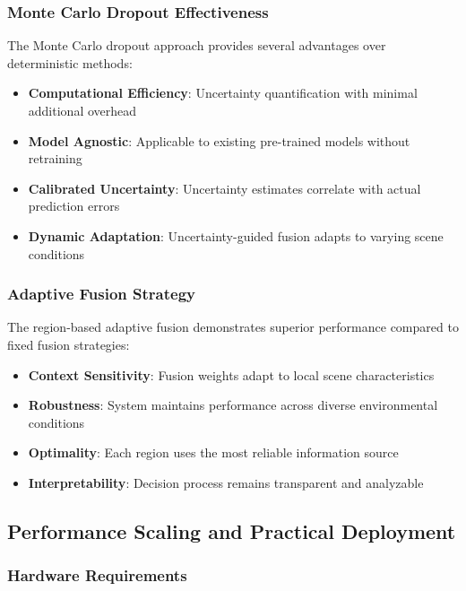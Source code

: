 \documentclass[12pt,oneside]{book}
\begin{document}
\subsubsection{Monte Carlo Dropout Effectiveness}

The Monte Carlo dropout approach provides several advantages over deterministic methods:

\begin{itemize}
\item \textbf{Computational Efficiency}: Uncertainty quantification with minimal additional overhead
\item \textbf{Model Agnostic}: Applicable to existing pre-trained models without retraining
\item \textbf{Calibrated Uncertainty}: Uncertainty estimates correlate with actual prediction errors
\item \textbf{Dynamic Adaptation}: Uncertainty-guided fusion adapts to varying scene conditions
\end{itemize}

\subsubsection{Adaptive Fusion Strategy}

The region-based adaptive fusion demonstrates superior performance compared to fixed fusion strategies:

\begin{itemize}
\item \textbf{Context Sensitivity}: Fusion weights adapt to local scene characteristics
\item \textbf{Robustness}: System maintains performance across diverse environmental conditions
\item \textbf{Optimality}: Each region uses the most reliable information source
\item \textbf{Interpretability}: Decision process remains transparent and analyzable
\end{itemize}

\subsection{Performance Scaling and Practical Deployment}

\subsubsection{Hardware Requirements}
\end{document}
